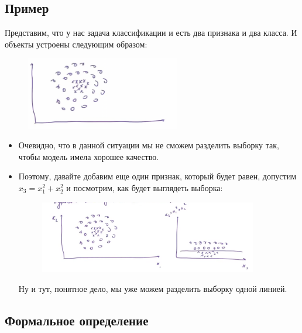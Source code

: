     \subsection{Пример}

        Представим, что у нас задача классификации и есть два признака и два класса. И объекты устроены следующим образом:
        \begin{figure}[H]
            \centering
            \includegraphics[width=0.6\textwidth]{images/15lecture/kernel_method_example1.png}
        \end{figure}
        \begin{itemize}
            \item Очевидно, что в данной ситуации мы не сможем разделить выборку так, чтобы модель имела хорошее качество.\\

            \item Поэтому, давайте добавим еще один признак, который будет равен, допустим $x_3 = x_1^2 + x_2^2$ и посмотрим, как будет выглядеть выборка:

            \begin{figure}[H]
                \centering
                \includegraphics[width=0.9\textwidth]{images/15lecture/kernel_method_example2.png}
            \end{figure}

            Ну и тут, понятное дело, мы уже можем разделить выборку одной линией.
        \end{itemize}

    \subsection{Формальное определение}

